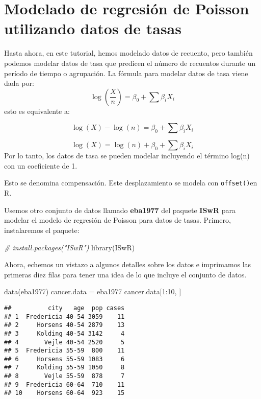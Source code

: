 \documentclass[
]{book}
\newenvironment{Shaded}{\begin{snugshade}}{\end{snugshade}}
\newcommand{\CommentTok}[1]{\textcolor[rgb]{0.56,0.35,0.01}{\textit{#1}}}
\newcommand{\DecValTok}[1]{\textcolor[rgb]{0.00,0.00,0.81}{#1}}
\newcommand{\FunctionTok}[1]{\textcolor[rgb]{0.00,0.00,0.00}{#1}}
\newcommand{\NormalTok}[1]{#1}
\newcommand{\OtherTok}[1]{\textcolor[rgb]{0.56,0.35,0.01}{#1}}
\newcommand{\SpecialCharTok}[1]{\textcolor[rgb]{0.00,0.00,0.00}{#1}}
\begin{document}
\hypertarget{modelado-de-regresiuxf3n-de-poisson-utilizando-datos-de-tasas}{%
\chapter{Modelado de regresión de Poisson utilizando datos de tasas}\label{modelado-de-regresiuxf3n-de-poisson-utilizando-datos-de-tasas}}

Hasta ahora, en este tutorial, hemos modelado datos de recuento, pero también podemos modelar datos de tasa que predicen el número de recuentos durante un período de tiempo o agrupación. La fórmula para modelar datos de tasa viene dada por: \[\log (\frac{X}{n})=\beta_{0}+\sum \beta_i X_{i}\] esto es equivalente a:

\[\log (X)-\log (n)=\beta_{0}+\sum \beta_{i} X_{i}\]

\[\log (X)=\log (n)+\beta_{0}+\sum \beta_i X_{i}\] Por lo tanto, los datos de tasa se pueden modelar incluyendo el término log(n) con un coeficiente de 1.

Esto se denomina compensación. Este desplazamiento se modela con \texttt{offset()}en R.

Usemos otro conjunto de datos llamado \textbf{eba1977} del paquete \textbf{ISwR} para modelar el modelo de regresión de Poisson para datos de tasas. Primero, instalaremos el paquete:

\begin{Shaded}
\begin{Highlighting}[]
\CommentTok{\# install.packages("ISwR")}
\FunctionTok{library}\NormalTok{(ISwR)}
\end{Highlighting}
\end{Shaded}

Ahora, echemos un vistazo a algunos detalles sobre los datos e imprimamos las primeras diez filas para tener una idea de lo que incluye el conjunto de datos.

\begin{Shaded}
\begin{Highlighting}[]
\FunctionTok{data}\NormalTok{(eba1977)}
\NormalTok{cancer.data }\OtherTok{=}\NormalTok{ eba1977}
\NormalTok{cancer.data[}\DecValTok{1}\SpecialCharTok{:}\DecValTok{10}\NormalTok{, ]}
\end{Highlighting}
\end{Shaded}

\begin{verbatim}
##          city   age  pop cases
## 1  Fredericia 40-54 3059    11
## 2     Horsens 40-54 2879    13
## 3     Kolding 40-54 3142     4
## 4       Vejle 40-54 2520     5
## 5  Fredericia 55-59  800    11
## 6     Horsens 55-59 1083     6
## 7     Kolding 55-59 1050     8
## 8       Vejle 55-59  878     7
## 9  Fredericia 60-64  710    11
## 10    Horsens 60-64  923    15
\end{verbatim}
\end{document}
